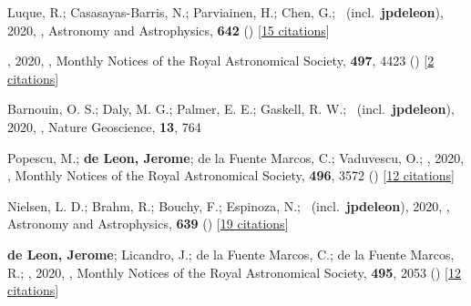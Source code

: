 \item[{\color{numcolor}\scriptsize125}] Luque, R.; Casasayas-Barris, N.; Parviainen, H.; Chen, G.; \etal\ (incl.\ \textbf{jpdeleon}), 2020, , Astronomy and Astrophysics, \textbf{642} () [\href{https://ui.adsabs.harvard.edu/abs/2020A&A...642A..50L}{15 citations}]

\item[{\color{numcolor}\scriptsize124}] , 2020, , Monthly Notices of the Royal Astronomical Society, \textbf{497}, 4423 () [\href{https://ui.adsabs.harvard.edu/abs/2020MNRAS.497.4423N}{2 citations}]

\item[{\color{numcolor}\scriptsize123}] Barnouin, O. S.; Daly, M. G.; Palmer, E. E.; Gaskell, R. W.; \etal\ (incl.\ \textbf{jpdeleon}), 2020, , Nature Geoscience, \textbf{13}, 764

\item[{\color{numcolor}\scriptsize122}] Popescu, M.; \textbf{de Leon, Jerome}; de la Fuente Marcos, C.; Vaduvescu, O.; \etal, 2020, , Monthly Notices of the Royal Astronomical Society, \textbf{496}, 3572 () [\href{https://ui.adsabs.harvard.edu/abs/2020MNRAS.496.3572P}{12 citations}]

\item[{\color{numcolor}\scriptsize121}] Nielsen, L. D.; Brahm, R.; Bouchy, F.; Espinoza, N.; \etal\ (incl.\ \textbf{jpdeleon}), 2020, , Astronomy and Astrophysics, \textbf{639} () [\href{https://ui.adsabs.harvard.edu/abs/2020A&A...639A..76N}{19 citations}]

\item[{\color{numcolor}\scriptsize120}] \textbf{de Leon, Jerome}; Licandro, J.; de la Fuente Marcos, C.; de la Fuente Marcos, R.; \etal, 2020, , Monthly Notices of the Royal Astronomical Society, \textbf{495}, 2053 () [\href{https://ui.adsabs.harvard.edu/abs/2020MNRAS.495.2053D}{12 citations}]

